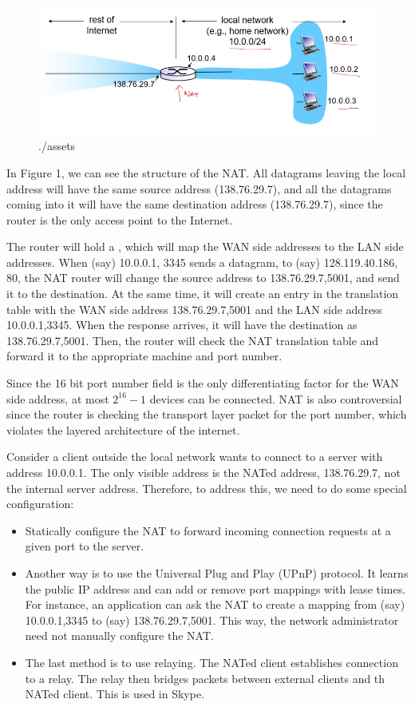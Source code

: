 \documentclass[12pt,letterpaper]{book}
\theoremstyle{definition}
\begin{document}
\begin{figure}[htpb]
  \centering
  \includegraphics[width=0.8\linewidth]{./assets/NAT_eg.png}
  \caption{./assets}%
  \label{fig:./assets}
\end{figure}

In Figure 1, we can see the structure of the NAT. All datagrams leaving the local address will have the same source address (138.76.29.7), and all the datagrams coming into it will have the same destination address (138.76.29.7), since the router is the only access point to the Internet.

The router will hold a , which will map the WAN side addresses to the LAN side addresses. When (say) 10.0.0.1, 3345 sends a datagram, to (say) 128.119.40.186, 80, the NAT router will change the source address to 138.76.29.7,5001, and send it to the destination. At the same time, it will create an entry in the translation table with the WAN side address 138.76.29.7,5001 and the LAN side address 10.0.0.1,3345. When the response arrives, it will have the destination as 138.76.29.7,5001. Then, the router will check the NAT translation table and forward it to the appropriate machine and port number.

Since the 16 bit port number field is the only differentiating factor for the WAN side address, at most $2^{16}-1$ devices can be connected. NAT is also controversial since the router is checking the transport layer packet for the port number, which violates the layered architecture of the internet.

Consider a client outside the local network wants to connect to a server with address 10.0.0.1. The only visible address is the NATed address, 138.76.29.7, not the internal server address. Therefore, to address this, we need to do some special configuration:

\begin{itemize}
  \item Statically configure the NAT to forward incoming connection requests at a given port to the server.
  \item Another way is to use the Universal Plug and Play (UPnP) protocol. It learns the public IP address and can add or remove port mappings with lease times. For instance, an application can ask the NAT to create a mapping from (say) 10.0.0.1,3345 to (say) 138.76.29.7,5001. This way, the network administrator need not manually configure the NAT.
  \item The last method is to use relaying. The NATed client establishes connection to a relay. The relay then bridges packets between external clients and th NATed client. This is used in Skype.
\end{itemize}
\end{document}
